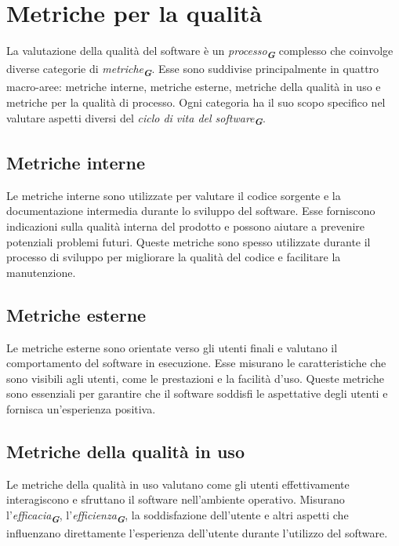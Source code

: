 


\section{Metriche per la qualità}

La valutazione della qualità del software è un \emph{processo}\textsubscript{\textit{\textbf{G}}} complesso che coinvolge diverse
categorie di \emph{metriche}\textsubscript{\textit{\textbf{G}}}. Esse sono suddivise principalmente in quattro macro-aree: metriche
interne, metriche esterne, metriche della qualità in uso e metriche per la qualità di processo.
Ogni categoria ha il suo scopo specifico nel valutare aspetti diversi del \emph{ciclo di vita del
software}\textsubscript{\textit{\textbf{G}}}.


\subsection{Metriche interne}
Le metriche interne sono utilizzate per valutare il codice sorgente e la documentazione
intermedia durante lo sviluppo del software. Esse forniscono indicazioni sulla qualità interna
del prodotto e possono aiutare a prevenire potenziali problemi futuri. Queste metriche
sono spesso utilizzate durante il processo di sviluppo per migliorare la qualità del codice e
facilitare la manutenzione.


\subsection{Metriche esterne}
Le metriche esterne sono orientate verso gli utenti finali e valutano il comportamento del
software in esecuzione. Esse misurano le caratteristiche che sono visibili agli utenti, come le
prestazioni e la facilità d’uso. Queste metriche sono essenziali per garantire che il software
soddisfi le aspettative degli utenti e fornisca un’esperienza positiva.


\subsection{Metriche della qualità in uso}
Le metriche della qualità in uso valutano come gli utenti effettivamente interagiscono e
sfruttano il software nell’ambiente operativo. Misurano l’\emph{efficacia}\textsubscript{\textit{\textbf{G}}}, 
l’\emph{efficienza}\textsubscript{\textit{\textbf{G}}}, la soddisfazione dell’utente e altri aspetti che 
influenzano direttamente l’esperienza dell’utente durante l’utilizzo del software.


